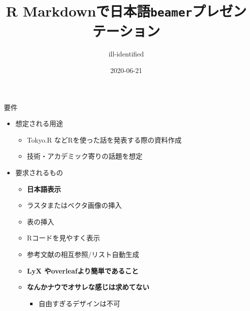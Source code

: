 \documentclass[
  14pt,
  ignorenonframetext,
]{beamer}
\title{R Markdownで日本語\texttt{beamer}プレゼンテーション}
\author{ill-identified}
\date{2020-06-21}
\providecommand{\tightlist}{%
  \setlength{\itemsep}{0pt}\setlength{\parskip}{0pt}}
\begin{document}
\frame{\titlepage}

\begin{frame}
  \tableofcontents[hideallsubsections]
\end{frame}
\begin{frame}{要件}
\protect\hypertarget{ux8981ux4ef6}{}

\begin{itemize}
\tightlist
\item
  想定される用途

  \begin{itemize}
  \tightlist
  \item
    Tokyo.R などRを使った話を発表する際の資料作成
  \item
    技術・アカデミック寄りの話題を想定
  \end{itemize}
\item
  要求されるもの

  \begin{itemize}
  \tightlist
  \item
    \textbf{日本語表示}
  \item
    ラスタまたはベクタ画像の挿入
  \item
    表の挿入
  \item
    Rコードを見やすく表示
  \item
    参考文献の相互参照/リスト自動生成
  \item
    \textbf{LyX やoverleafより簡単であること}
  \item
    \textbf{なんかナウでオサレな感じは求めてない}

    \begin{itemize}
    \tightlist
    \item
      自由すぎるデザインは不可
    \end{itemize}
  \end{itemize}
\end{itemize}

\end{frame}
\end{document}
